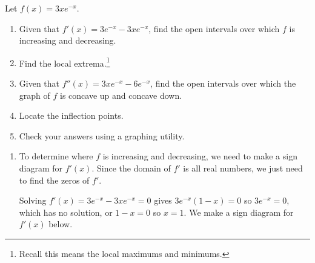 \documentclass{ximera}
\begin{document}
\begin{example}\label{exponentialcurvesketchingex} Let $f(x) = 3xe^{-x}$.

\begin{enumerate}

\item  Given that $f'(x) = 3e^{-x} - 3x e^{-x}$, find the open intervals over which $f$ is increasing and decreasing.

\item Find the local extrema.\footnote{Recall this means the local maximums and minimums.}

\item Given that $f''(x) = 3xe^{-x} - 6e^{-x}$, find the open intervals over which the graph of $f$ is concave up and concave down.

\item  Locate the inflection points.

\item  Check your answers using a graphing utility.

\end{enumerate}

\begin{explanation}

\begin{enumerate}

\item  To determine where $f$ is increasing and decreasing, we need to make a sign diagram for $f'(x)$.  Since the domain of $f'$ is all real numbers, we just need to find the zeros of $f'$. 

Solving $f'(x) =  3e^{-x} - 3x e^{-x} = 0$ gives $3e^{-x} (1-x) = 0$ so $3e^{-x} = 0$, which has no solution,  or $1-x =0$ so $x=1$.  We make a sign diagram for $f'(x)$ below.

\begin{image}
\end{image}
\end{enumerate}
\end{explanation}
\end{example}
\end{document}
